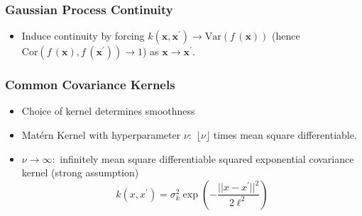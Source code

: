 \documentclass{beamer}
\begin{document}

\begin{frame}
    \frametitle{Gaussian Process Continuity}
    \begin{itemize}
        \item Induce continuity by forcing
              $k(\mathbf{x}, \mathbf{x}^\prime) \to \mathrm{Var}(f\,(\mathbf{x}))$
              (hence $\mathrm{Cor}(f\,(\mathbf{x}), f\,(\mathbf{x}^\prime)) \to 1$)
              as $\mathbf{x}\to \mathbf{x}^\prime.$
    \end{itemize}
\end{frame}

\begin{frame}
    \frametitle{Common Covariance Kernels}
    \begin{itemize}
        \item Choice of kernel determines smoothness
        \item Mat\'ern Kernel with hyperparameter $\nu:$
              $\lfloor{\nu}\rfloor$ times mean square differentiable.
        \item $\nu\to\infty:$ infinitely mean square differentiable squared
              exponential covariance kernel (strong assumption)
              $$
                  k(x, x^\prime)
                  = \sigma^2_k\exp(-\frac{||x - x^\prime||^2}{2\ell^2})
              $$
    \end{itemize}
\end{frame}
\end{document}
